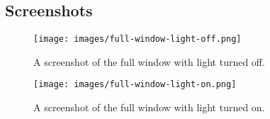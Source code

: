 \documentclass{article}
\let\oldsubsection\subsection
\renewcommand\subsection{\needspace{5\baselineskip}\oldsubsection}
\begin{document}
\clearpage

\subsection{Screenshots}

\begin{figure}[h]
    \centering
    \texttt{[image: images/full-window-light-off.png]}
    \caption{A screenshot of the full window with light turned off.}
    \label{fig:full-window}
\end{figure}

\begin{figure}[h]
    \centering
    \texttt{[image: images/full-window-light-on.png]}
    \caption{A screenshot of the full window with light turned on.}
    \label{fig:viewport}
\end{figure}
\end{document}
